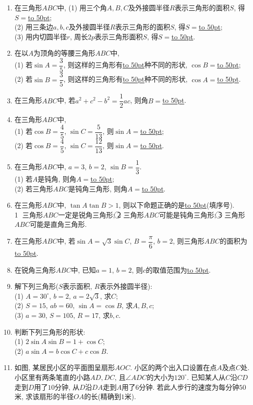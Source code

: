 \documentclass[10pt,a4paper]{article}
\newcommand{\blank}[1]{\underline{\hbox to #1pt{}}}
\begin{document}
\begin{enumerate}[1.]

\item 在三角形$ABC$中,
(1) 用三个角$A,B,C$及外接圆半径$R$表示三角形的面积$S$, 得$S=$\blank{50};\\
(2) 用三条边$a,b,c$及外接圆半径$R$表示三角形的面积$S$, 得$S=$\blank{50};\\
(3) 用内切圆半径$r$, 周长$2p$表示三角形面积$S$, 得$S=$\blank{50}.
\item 在以$A$为顶角的等腰三角形$ABC$中,\\
(1) 若$\sin A=\dfrac 35$, 则这样的三角形有\blank{50}种不同的形状, $\cos B=$\blank{50};\\
(2) 若$\sin B=\dfrac 35$, 则这样的三角形有\blank{50}种不同的形状, $\cos A=$\blank{50}.
\item 在三角形$ABC$中, 若$a^2+c^2-b^2=\dfrac 12ac$, 则角$B=$\blank{50}.
\item 在三角形$ABC$中,\\
(1) 若$\cos B=\dfrac 45$, $\sin C=\dfrac 5{13}$, 则$\sin A=$\blank{50};\\
(2) 若$\cos B=\dfrac 45$, $\sin C=\dfrac{12}{13}$, 则$\sin A=$\blank{50}.
\item 在三角形$ABC$中, $a=3$, $b=2$, $\sin B=\dfrac 13$.\\
(1) 若$A$是钝角, 则角$A=$\blank{50};\\
(2) 若三角形$ABC$是钝角三角形, 则角$A=$\blank{50}.
\item 在三角形$ABC$中, $\tan A\tan B>1$, 则以下命题正确的是\blank{50}(填序号).\\
\textcircled{1} 三角形$ABC$一定是锐角三角形;
\textcircled{2} 三角形$ABC$可能是钝角三角形;
\textcircled{3} 三角形$ABC$可能是直角三角形.
\item 在三角形$ABC$中, 若$\sin A=\sqrt 3\sin C$, $B=\dfrac{\pi}6$, $b=2$, 则三角形$ABC$的面积为\blank{50}.
\item 在锐角三角形$ABC$中, 已知$a=1$, $b=2$, 则$c$的取值范围为\blank{50}.
\item 解下列三角形($S$表示面积, $R$表示外接圆半径):\\
(1) $A=30^\circ$, $b=2$, $a=2\sqrt 3$, 求$C$;\\
(2) $S=15$, $ab=60$, $\sin A=\cos B$, 求$A,B,c$;\\
(3) $a=30$, $S=105$, $R=17$, 求$b,c$.
\item 判断下列三角形的形状:\\
(1) $2\sin A\sin B=1+\cos C$;\\
(2) $a\sin A=b\cos C+c\cos B$.
\item 如图, 某居民小区的平面图呈扇形$AOC$. 小区的两个出入口设置在点$A$及点$C$处. 小区里有两条笔直的小路$AD,DC$, 且$\angle ADC$的大小为$120^\circ$. 已知某人从$C$沿$CD$走到$D$用了$10$分钟, 从$D$沿$DA$走到$A$用了$6$分钟. 若此人步行的速度为每分钟$50$米, 求该扇形的半径$OA$的长(精确到$1$米).

\end{enumerate}
\end{document}
